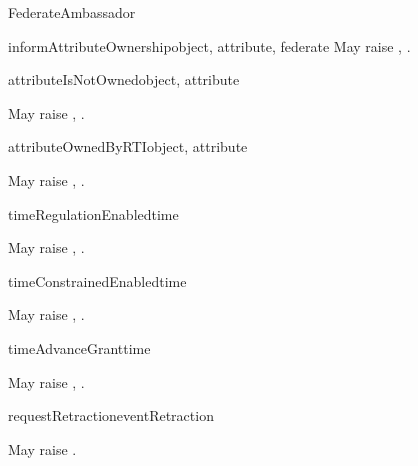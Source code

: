 \begin{classdesc}{FederateAmbassador}{}
\begin{methoddesc}{informAttributeOwnership}{object, attribute, federate}
May raise
,
.
\end{methoddesc}

\begin{methoddesc}{attributeIsNotOwned}{object, attribute}

May raise
,
.
\end{methoddesc}

\begin{methoddesc}{attributeOwnedByRTI}{object, attribute}

May raise
,
.
\end{methoddesc}

\medskip
{}

\begin{methoddesc}{timeRegulationEnabled}{time}

May raise
,
.
\end{methoddesc}

\begin{methoddesc}{timeConstrainedEnabled}{time}

May raise
,
.
\end{methoddesc}

\begin{methoddesc}{timeAdvanceGrant}{time}

May raise
,
.
\end{methoddesc}

\begin{methoddesc}{requestRetraction}{eventRetraction}

May raise
.
\end{methoddesc}

\end{classdesc}

